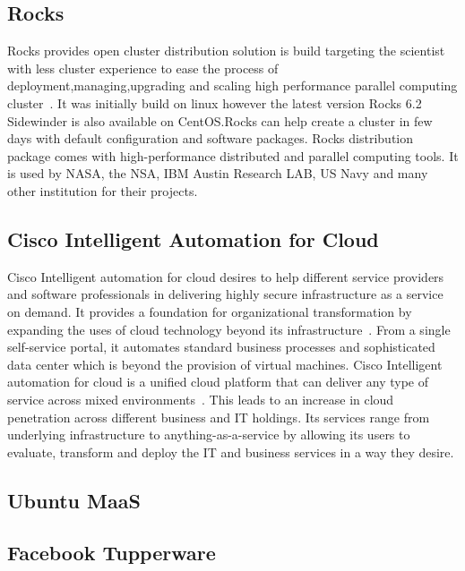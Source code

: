 {     \pv

\subsection{Rocks}

Rocks provides open cluster distribution solution is build targeting
the scientist with less cluster experience to ease the process of
deployment,managing,upgrading and scaling high performance parallel
computing cluster~\cite{www-rockscluster}.  It was initially build on
linux however the latest version Rocks 6.2 Sidewinder is also
available on CentOS.Rocks can help create a cluster in few days with
default configuration and software packages.  Rocks distribution
package comes with high-performance distributed and parallel computing
tools. It is used by NASA, the NSA, IBM Austin Research LAB, US Navy
and many other institution for their projects.

     \pv

\subsection{Cisco Intelligent Automation for Cloud}

Cisco Intelligent automation for cloud desires to help different
service providers and software professionals in delivering highly
secure infrastructure as a service on demand. It provides a foundation
for organizational transformation by expanding the uses of cloud
technology beyond its infrastructure~\cite{cis1}. From a single
self-service portal, it automates standard business processes and
sophisticated data center which is beyond the provision of virtual
machines. Cisco Intelligent automation for cloud is a unified cloud
platform that can deliver any type of service across mixed
environments~\cite{cis2}. This leads to an increase in cloud
penetration across different business and IT holdings. Its services
range from underlying infrastructure to anything-as-a-service by
allowing its users to evaluate, transform and deploy the IT and
business services in a way they desire.

\subsection{Ubuntu MaaS}

\pv

\subsection{Facebook Tupperware}

}

